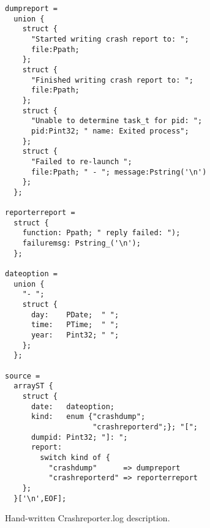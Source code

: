 \begin{figure}[t]
\begin{small}
\begin{verbatim}
dumpreport =
  union {
    struct {
      "Started writing crash report to: "; 
      file:Ppath;
    };
    struct {
      "Finished writing crash report to: "; 
      file:Ppath;
    };
    struct {
      "Unable to determine task_t for pid: "; 
      pid:Pint32; " name: Exited process";
    };
    struct {
      "Failed to re-launch "; 
      file:Ppath; " - "; message:Pstring('\n')
    };
  };

reporterreport =
  struct {
    function: Ppath; " reply failed: ");
    failuremsg: Pstring_('\n'); 
  };

dateoption = 
  union {
    "- ";
    struct {
      day:    PDate;  " ";
      time:   PTime;  " ";
      year:   Pint32; " ";
    };
  };

source =
  arrayST {
    struct {
      date:   dateoption;
      kind:   enum {"crashdump"; 
                    "crashreporterd";}; "[";
      dumpid: Pint32; "]: ";
      report: 
        switch kind of {
          "crashdump"      => dumpreport
          "crashreporterd" => reporterreport
    };
  }['\n',EOF];
\end{verbatim}
\end{small}
\caption{Hand-written \ir{} Crashreporter.log description.}
\label{fig:crashreporter:ir}
\end{figure}
